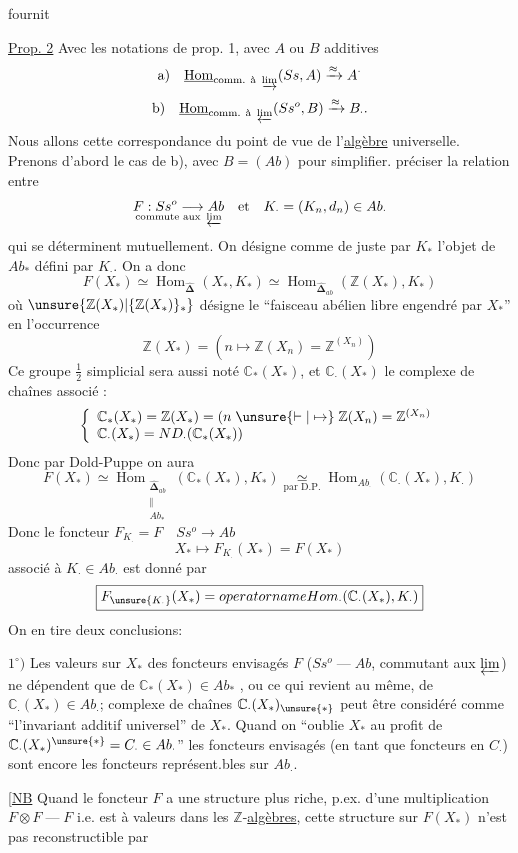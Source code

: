 fournit 

\uline{Prop. 2} Avec les notations  de prop. 1, avec $A$ ou $B$
additives 
\[
 \text{a)}\quad\underline{\operatorname{Hom}}_{\text{comm. à }\varinjlim}(Ss,A)
 \xrightarrow{\approx}A^{\cdot}
\]
\[
 \text{b)}\quad\underline{\operatorname{Hom}}_{\text{comm. à }\varprojlim}(Ss^o,B)
 \xrightarrow{\approx}B_{\cdot}.
\]
Nous allons  cette correspondance du point
de vue de l'\uline{algèbre} universelle. Prenons d'abord le cas de b), avec
$B=(Ab)$ pour simplifier. 
 préciser la relation entre
\[
 \underset{\text{commute aux }\varprojlim}{F:Ss^o\longrightarrow Ab}
 \quad\text{et}\quad K_{\cdot}=(K_n,d_n)\in Ab_{\cdot}
\]
qui se déterminent mutuellement. On désigne comme de juste par $K_*$ l'objet
de $Ab_*$ défini par $K_{\cdot}$. On a donc
\[
 F(X_*)\simeq\operatorname{Hom}_{\widehat{\boldsymbol\Delta}}(X_*,K_*)
 \simeq\operatorname{Hom}_{\widehat{\boldsymbol\Delta}_{ab}}(\mathbb Z(X_*),K_*)
\]
où $\unsure{\mathbb Z(X_*)|\{\mathbb Z(X_*)\}_*}$ désigne le ``faisceau abélien
libre engendré par $X_*$'' en l'occurrence
\[
 \mathbb Z(X_*)=(n\longmapsto\mathbb Z(X_n)=\mathbb Z^{(X_n)})
\]
Ce groupe  $\tfrac12$ simplicial sera aussi noté $\mathbb C_*(X_*)$,
et $\mathbb C_{\cdot}(X_*)$ le complexe de chaînes associé :
\[
 \left\{\begin{array}{l}
 \mathbb C_*(X_*)=\mathbb Z(X_*)=(n\mathrel{\unsure{\vdash|\mapsto}}\mathbb Z(X_n)=\mathbb Z^{(X_n)}\\
 \mathbb C_{\cdot}(X_*)=ND_{\cdot}(\mathbb C_*(X_*))
 \end{array}\right.
\]
Donc par Dold-Puppe on aura
\[
 F(X_*)\simeq
 \operatorname{Hom}_{\substack{\widehat{\boldsymbol\Delta}_{ab}\\\Vert\\Ab_*}}
 (\mathbb C_*(X_*),K_*)
 \underset{\text{par D.P.}}{\simeq}
 \operatorname{Hom}_{Ab_{\cdot}}(\mathbb C_{\cdot}(X_*),K_{\cdot})
\]
Donc le foncteur $F_{K_{\cdot}}=F\quad Ss^o\longrightarrow Ab$
\[
 X_*\longmapsto F_{K_{\cdot}}(X_*)=F(X_*)
\]
associé à $K_{\cdot}\in Ab_{\cdot}$ est donné par
\[
 \boxed{F_{\unsure{K_{\cdot}}}(X_*)=operatorname{Hom}_{\cdot}(\mathbb C_{\cdot}(X_*),K_{\cdot})}
\]
On en tire deux conclusions:

$1^\circ)$ Les valeurs sur $X_*$ des foncteurs envisagés $F$
($Ss^o\mathbin{\text{---}}Ab$, commutant aux $\varprojlim$) ne dépendent que de
$\mathbb C_*(X_*)\in Ab_*$ , ou ce qui revient
au même, de $\mathbb C_{\cdot}(X_*)\in Ab_{\cdot}$;
 complexe de chaînes $\mathbb C_{\cdot}(X_*)_{\unsure{*}}$
peut être considéré comme ``l'invariant additif universel'' de $X_*$.
Quand on ``oublie $X_*$ au profit de $\mathbb C_{\cdot}(X_*)^{\unsure{*}}=C_{\cdot}\in Ab_{\cdot}$''
les foncteurs envisagés (en tant que foncteurs en $C_{\cdot}$) sont encore
 les foncteurs représent.bles sur $Ab_{\cdot}$.

[\uline{NB} Quand le foncteur $F$ a une structure plus riche, p.ex. d'une
multiplication $F\otimes F\mathbin{\text{---}}F$ i.e. est à valeurs dans les
$\mathbb Z$-\uline{algèbres},  cette structure sur $F(X_*)$
n'est pas reconstructible par
